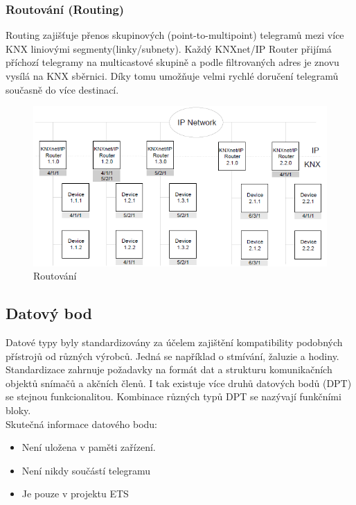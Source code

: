 \subsubsection{Routování (Routing)} 
Routing zajišťuje přenos skupinových (point-to-multipoint) telegramů mezi více KNX liniovými segmenty(linky/subnety). Každý KNXnet/IP Router přijímá příchozí telegramy na multicastové skupině a podle filtrovaných adres je znovu vysílá na KNX sběrnici. Díky tomu umožňuje velmi rychlé doručení telegramů současně do více destinací. \cite{KNXRouting}
\begin{figure}[!h]
  \begin{center}
    \includegraphics[scale=0.65]{obrazky/KNX_Routing.png}
  \end{center}
  \caption[Routování \cite{KNXRouting}]{Routování \cite{KNXRouting}}
  \label{fig:Routovani}
\end{figure}
\pagebreak
\subsection{Datový bod}
Datové typy byly standardizovány za účelem zajištění kompatibility podobných přístrojů od různých výrobců. Jedná se například o stmívání, žaluzie a hodiny. Standardizace zahrnuje požadavky na formát dat a strukturu komunikačních objektů snímačů a akčních členů. I tak existuje více druhů datových bodů (DPT) se stejnou funkcionalitou. Kombinace různých typů DPT se nazývají funkčními bloky. \cite{Celkovy prehled}
\\Skutečná informace datového bodu:
\begin{itemize}
    \item Není uložena v paměti zařízení.
    \item Není nikdy součástí telegramu
    \item Je pouze v projektu ETS \newline
\end{itemize}

